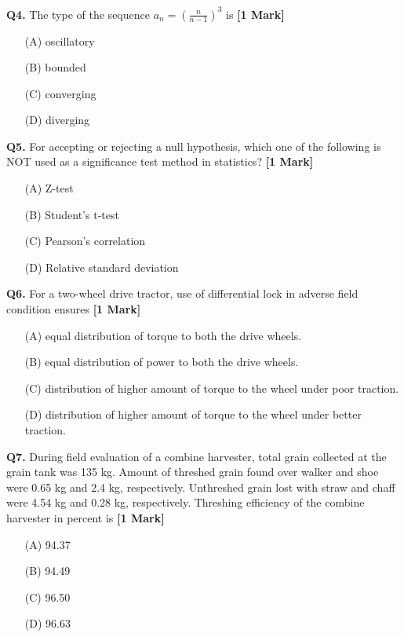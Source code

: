 \documentclass[11pt]{article}
\newcommand{\questiona}[2]{
    \noindent\textbf{Q#2.} #1 \hfill \textbf{[1 Mark]}
}
\begin{document}
\questiona{The type of the sequence \( a_n = \left( \frac{n}{n-1} \right)^3 \) is}{4}
\begin{enumerate}
    \item[(A)] oscillatory  
    \item[(B)] bounded  
    \item[(C)] converging  
    \item[(D)] diverging  
\end{enumerate}
\vspace{0.5cm}

\questiona{For accepting or rejecting a null hypothesis, which one of the following is NOT used as a significance test method in statistics?}{5}
\begin{enumerate}
    \item[(A)] Z-test  
    \item[(B)] Student's t-test  
    \item[(C)] Pearson's correlation  
    \item[(D)] Relative standard deviation  
\end{enumerate}
\vspace{0.5cm}

\questiona{For a two-wheel drive tractor, use of differential lock in adverse field condition ensures}{6}
\begin{enumerate}
    \item[(A)] equal distribution of torque to both the drive wheels.  
    \item[(B)] equal distribution of power to both the drive wheels.  
    \item[(C)] distribution of higher amount of torque to the wheel under poor traction.  
    \item[(D)] distribution of higher amount of torque to the wheel under better traction.  
\end{enumerate}
\vspace{0.5cm}

\questiona{During field evaluation of a combine harvester, total grain collected at the grain tank was 135 kg. Amount of threshed grain found over walker and shoe were 0.65 kg and 2.4 kg, respectively. Unthreshed grain lost with straw and chaff were 4.54 kg and 0.28 kg, respectively. Threshing efficiency of the combine harvester in percent is}{7}
\begin{enumerate}
    \item[(A)] 94.37  
    \item[(B)] 94.49  
    \item[(C)] 96.50  
    \item[(D)] 96.63  
\end{enumerate}
\vspace{0.5cm}
\end{document}

